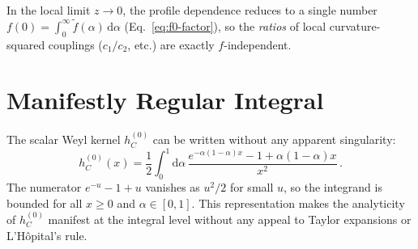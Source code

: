 \documentclass[aps,prd,twocolumn,superscriptaddress,nofootinbib,floatfix]{revtex4-2}
\theoremstyle{definition}
\theoremstyle{remark}
\newcommand{\dd}{\mathrm{d}}
\begin{document}
In the local limit $z \to 0$, the profile dependence reduces to a single
number $f(0) = \int_0^\infty \tilde{f}(\alpha)\,\dd\alpha$
(Eq.~\eqref{eq:f0-factor}), so the \emph{ratios} of local curvature-squared
couplings ($c_1/c_2$, etc.) are exactly $f$-independent.


\section{Manifestly Regular Integral}
\label{app:regular}

The scalar Weyl kernel $h_C^{(0)}$ can be written without any apparent
singularity:
\begin{equation}
  h_C^{(0)}(x) = \frac{1}{2}\int_0^1 \dd\alpha\,
    \frac{e^{-\alpha(1-\alpha)x} - 1 + \alpha(1-\alpha)x}{x^2}\,.
\end{equation}
The numerator $e^{-u} - 1 + u$ vanishes as $u^2/2$ for small $u$, so the
integrand is bounded for all $x \geq 0$ and $\alpha \in [0,1]$. This
representation makes the analyticity of $h_C^{(0)}$ manifest at the integral
level without any appeal to Taylor expansions or L'H\^opital's rule.



\end{document}
